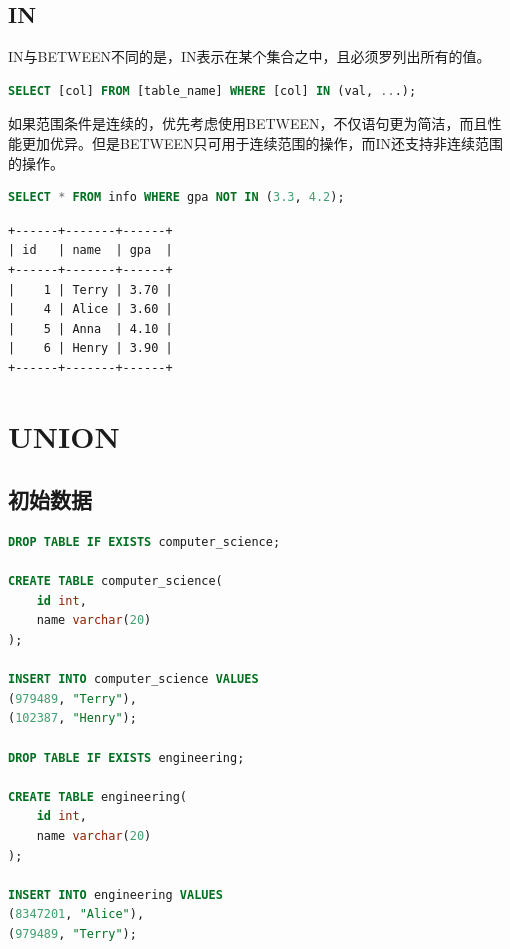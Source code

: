 \documentclass[12pt, openany, oneside]{book}
\begin{document}
\vspace{0.5cm}

\section{IN}

IN与BETWEEN不同的是，IN表示在某个集合之中，且必须罗列出所有的值。

\vspace{-0.5cm}

\begin{lstlisting}[language=SQL]
SELECT [col] FROM [table_name] WHERE [col] IN (val, ...);
\end{lstlisting}

如果范围条件是连续的，优先考虑使用BETWEEN，不仅语句更为简洁，而且性能更加优异。但是BETWEEN只可用于连续范围的操作，而IN还支持非连续范围的操作。\\


\begin{lstlisting}[language=SQL]
SELECT * FROM info WHERE gpa NOT IN (3.3, 4.2);
\end{lstlisting}

\begin{tcolorbox}
\begin{verbatim}
+------+-------+------+
| id   | name  | gpa  |
+------+-------+------+
|    1 | Terry | 3.70 |
|    4 | Alice | 3.60 |
|    5 | Anna  | 4.10 |
|    6 | Henry | 3.90 |
+------+-------+------+
\end{verbatim}
\end{tcolorbox}

\newpage

\chapter{UNION}

\section{初始数据}


\begin{lstlisting}[language=SQL]
DROP TABLE IF EXISTS computer_science;

CREATE TABLE computer_science(
	id int,
	name varchar(20)
);

INSERT INTO computer_science VALUES
(979489, "Terry"),
(102387, "Henry");

DROP TABLE IF EXISTS engineering;

CREATE TABLE engineering(
	id int,
	name varchar(20)
);

INSERT INTO engineering VALUES
(8347201, "Alice"),
(979489, "Terry");
\end{lstlisting}
\end{document}
